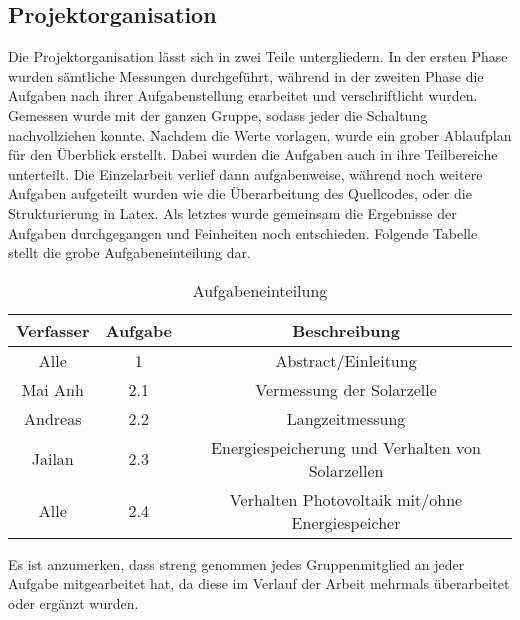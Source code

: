 \subsection {Projektorganisation}
	\par Die Projektorganisation lässt sich in zwei Teile untergliedern. In der ersten Phase wurden sämtliche Messungen durchgeführt, während in der zweiten Phase die Aufgaben nach ihrer Aufgabenstellung erarbeitet und verschriftlicht wurden. Gemessen wurde mit der ganzen Gruppe, sodass jeder die Schaltung nachvollziehen konnte. Nachdem die Werte vorlagen, wurde ein grober Ablaufplan für den Überblick erstellt. Dabei wurden die Aufgaben auch in ihre Teilbereiche unterteilt. Die Einzelarbeit verlief dann aufgabenweise, während noch weitere Aufgaben aufgeteilt wurden wie die Überarbeitung des Quellcodes, oder die Strukturierung in Latex. Als letztes wurde gemeinsam die Ergebnisse der Aufgaben durchgegangen und Feinheiten noch entschieden.
	\noindent
	Folgende Tabelle stellt die grobe Aufgabeneinteilung dar.
	\begin{table}[H]
		\centering
		\caption{Aufgabeneinteilung}
		\label{tab:Beispieltabelle}
		\begin{tabular}{ccc}
			\toprule
			Verfasser & Aufgabe & Beschreibung \\
			\midrule
			Alle & 1 & Abstract/Einleitung \\
			Mai Anh & 2.1 & Vermessung der Solarzelle \\
			Andreas & 2.2 & Langzeitmessung \\
			Jailan & 2.3 & Energiespeicherung und Verhalten von Solarzellen \\
			Alle & 2.4 & Verhalten Photovoltaik mit/ohne Energiespeicher \\
			\bottomrule
		\end{tabular}
	\end{table}

	Es ist anzumerken, dass streng genommen jedes Gruppenmitglied an jeder Aufgabe mitgearbeitet hat, da diese im Verlauf der Arbeit mehrmals überarbeitet oder ergänzt wurden. 
